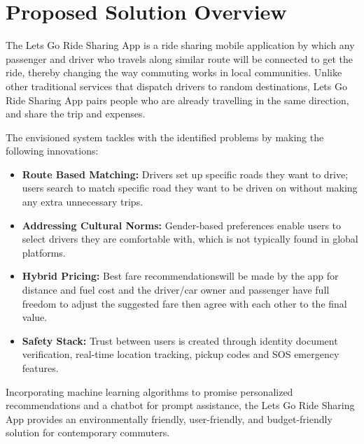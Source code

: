 
\section{Proposed Solution Overview}

The Lets Go Ride Sharing App is a ride sharing mobile application by which any passenger and driver who travels along similar route will be connected to get the ride, thereby changing the way commuting works in local communities. Unlike other traditional services that dispatch drivers to random destinations, Lets Go Ride Sharing App pairs people who are already travelling in the same direction, and share the trip and expenses.

The envisioned system tackles with the identified problems by making the following innovations:

\begin{itemize}
    \item \textbf{Route Based Matching:} Drivers set up specific roads they want to drive; users search to match specific road they want to be driven on without making any extra unnecessary trips.

    \item \textbf{Addressing Cultural Norms:} Gender-based preferences enable users to select drivers they are comfortable with, which is not typically found in global platforms.

    \item \textbf{Hybrid Pricing:} Best fare recommendationswill be made by the app for distance and fuel cost and the driver/car owner and passenger have full freedom to adjust the suggested fare then agree with each other to the final value.

    \item \textbf{Safety Stack:} Trust between users is created through identity document verification, real-time location tracking, pickup codes and SOS emergency features.
\end{itemize}

Incorporating machine learning algorithms to promise personalized recommendations and a chatbot for prompt assistance, the Lets Go Ride Sharing App provides an environmentally friendly, user-friendly, and budget-friendly solution for contemporary commuters.


